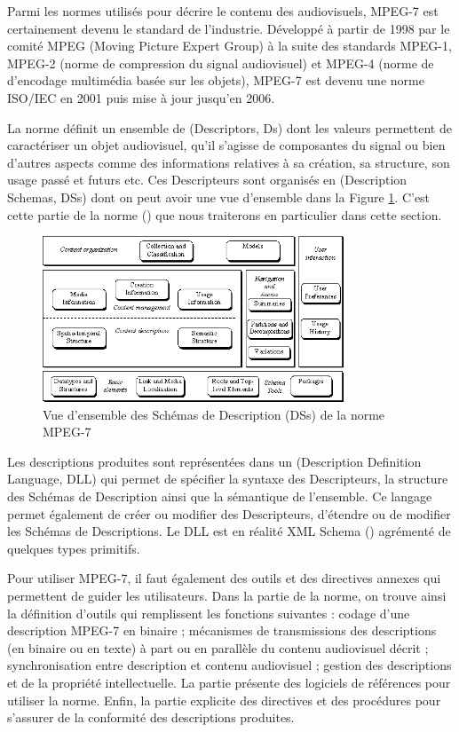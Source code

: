 Parmi les normes utilisés pour décrire le contenu des audiovisuels, MPEG-7 est certainement devenu le standard de l'industrie. 
Développé à partir de 1998 par le comité MPEG (Moving Picture Expert Group) à la suite des standards MPEG-1, MPEG-2 (norme de compression du signal audiovisuel) et MPEG-4 (norme de d'encodage multimédia basée sur les objets), MPEG-7 est devenu une norme ISO/IEC en 2001 puis mise à jour jusqu'en 2006. 

La norme définit un ensemble de  (Descriptors, Ds) dont les valeurs permettent de caractériser un objet audiovisuel, qu'il s'agisse de composantes du signal ou bien d'autres aspects comme des informations relatives à sa création, sa structure, son usage passé et futurs etc.
Ces Descripteurs sont organisés en  (Description Schemas, DSs) dont on peut avoir une vue d'ensemble dans la Figure \ref{img:soa:mds}.
C'est cette partie de la norme (\cite[Part 5 : Multimedia Description Scheme]{ISO/IEC2004}) que nous traiterons en particulier dans cette section. 

\begin{figure}[ht!]
\centering
\includegraphics[width=0.8\textwidth]{images/MPEG-7-MDS.png}
\caption{Vue d'ensemble des Schémas de Description (DSs) de la norme MPEG-7}
\label{img:soa:mds}
\end{figure}

Les descriptions produites sont représentées dans un  (Description Definition Language, DLL) qui permet de spécifier la syntaxe des Descripteurs, la structure des Schémas de Description ainsi que la sémantique de l'ensemble.
Ce langage permet également de créer ou modifier des Descripteurs, d'étendre ou de modifier les Schémas de Descriptions. 
Le DLL est en réalité XML Schema (\cite{Fallside2004}) agrémenté de quelques types primitifs.

Pour utiliser MPEG-7, il faut également des outils et des directives annexes qui permettent de guider les utilisateurs. 
Dans la partie  de la norme, on trouve ainsi la définition d'outils qui remplissent les fonctions suivantes : codage d'une description MPEG-7 en binaire ; mécanismes de transmissions des descriptions (en binaire ou en texte) à part ou en parallèle du contenu audiovisuel décrit ;  synchronisation entre description et contenu audiovisuel ; gestion des descriptions et de la propriété intellectuelle. 
La partie  présente des logiciels de références pour utiliser la norme.
Enfin, la partie  explicite des directives et des procédures pour s'assurer de la conformité des descriptions produites.

